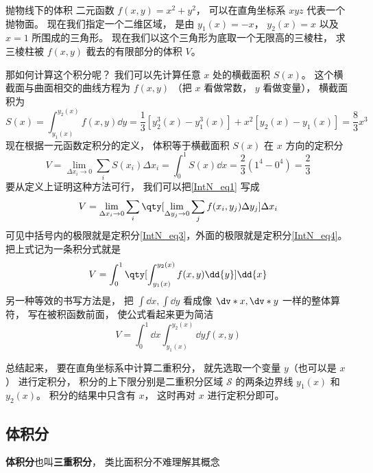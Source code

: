 \begin{example}{抛物线下的体积}\label{IntN_ex1}
二元函数 $f(x,y) = x^2 + y^2$， 可以在直角坐标系 $xyz$ 代表一个抛物面。 现在我们指定一个二维区域， 是由 $y_1(x) = -x$， $y_2(x) = x$ 以及 $x = 1$ 所围成的三角形。 现在我们以这个三角形为底取一个无限高的三棱柱， 求三棱柱被 $f(x,y)$ 截去的有限部分的体积 $V$。 %

那如何计算这个积分呢？ 我们可以先计算任意 $x$ 处的横截面积 $S(x)$。 这个横截面与曲面相交的曲线方程为 $f(x,y)$ （把 $x$ 看做常数， $y$ 看做变量）， 横截面积为
\begin{equation}\label{IntN_eq3}
S(x) = \int_{y_1(x)}^{y_2(x)} f(x,y) \dd{y} = \frac13 [y_2^3(x) - y_1^3(x)] + x^2[y_2(x) - y_1(x)] = \frac83 x^3
\end{equation}
现在根据一元函数定积分的定义， 体积等于横截面积 $S(x)$ 在 $x$ 方向的定积分
\begin{equation}\label{IntN_eq4}
V = \lim_{\Delta x_i\to 0} \sum_{i} S(x_i) \Delta x_i = \int_0^1 S(x) \dd{x} = \frac23 (1^4 -0^4) = \frac23
\end{equation}
要从定义上证明这种方法可行， 我们可以把\autoref{IntN_eq1} 写成
\begin{equation}
V = \lim_{\Delta x_i\to 0} \sum_{i} \qty[\lim_{\Delta y_j\to 0}\sum_{j} f(x_i,y_j) \Delta y_j ] \Delta x_i
\end{equation}
可见中括号内的极限就是定积分\autoref{IntN_eq3}，外面的极限就是定积分\autoref{IntN_eq4}。 把上式记为一条积分式就是
\begin{equation}
V = \int_0^1 \qty[\int_{y_1(x)}^{y_2(x)} f(x,y) \dd{y}] \dd{x}
\end{equation}
另一种等效的书写方法是， 把 $\int \dd{x}, \int \dd{y}$ 看成像 $\dv*{x}, \dv*{y}$ 一样的整体算符， 写在被积函数前面， 使公式看起来更为简洁
\begin{equation}\label{IntN_eq7}
V = \int_0^1 \dd{x} \int_{y_1(x)}^{y_2(x)} \dd{y} f(x,y)
\end{equation}
\end{example}

总结起来， 要在直角坐标系中计算二重积分， 就先选取一个变量 $y$（也可以是 $x$） 进行定积分， 积分的上下限分别是二重积分区域 $\mathcal{S}$ 的两条边界线 $y_1(x)$ 和 $y_2(x)$。 积分的结果中只含有 $x$， 这时再对 $x$ 进行定积分即可。


\subsection{体积分}
\textbf{体积分}也叫\textbf{三重积分}， 类比面积分不难理解其概念

